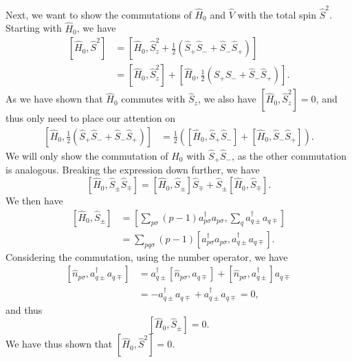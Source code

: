 Next, we want to show the commutations of $\hat{H}_0$ and $\hat{V}$ with the total spin $\hat{S}^2$.
Starting with $\hat{H}_0$, we have
\begin{align*}
    \left[ \hat{H}_0, \hat{S}^2 \right]
    &= \left[
        \hat{H}_0,
        \hat{S}_z^2 + \frac{1}{2}(\hat{S}_+ \hat{S}_- + \hat{S}_- \hat{S}_+)
    \right] \\
    &= \left[ \hat{H}_0, \hat{S}_z^2 \right] + \left[ \hat{H}_0, \frac{1}{2}(\hat{S}_+ \hat{S}_- + \hat{S}_- \hat{S}_+) \right].
\end{align*}
As we have shown that $\hat{H}_0$ commutes with $\hat{S}_z$, we also have $\left[ \hat{H}_0, \hat{S}_z^2 \right] = 0$, and thus only need to place our attention on
\begin{align*}
    \left[ \hat{H}_0, \frac{1}{2}(\hat{S}_+ \hat{S}_- + \hat{S}_- \hat{S}_+) \right]
    &= \frac{1}{2} \left(
        \left[
            \hat{H}_0, \hat{S}_+ \hat{S}_-
        \right]
        + \left[
            \hat{H}_0, \hat{S}_- \hat{S}_+
        \right]
    \right).
\end{align*}
We will only show the commutation of $\hat{H}_0$ with $\hat{S}_+ \hat{S}_-$, as the other commutation is analogous.
Breaking the expression down further, we have
\begin{equation*}
    \left[ \hat{H}_0, \hat{S}_\pm \hat{S}_\mp \right]
    = \left[ \hat{H}_0, \hat{S}_\pm \right] \hat{S}_\mp + \hat{S}_\pm \left[ \hat{H}_0, \hat{S}_\mp \right].
\end{equation*}
We then have
\begin{align*}
    \left[ \hat{H}_0, \hat{S}_{\pm} \right]
    &= \left[
        \sum_{p\sigma} (p-1) a_{p\sigma}^{\dagger} a_{p\sigma},
        \sum_{q} a^\dag_{q\pm} a_{q\mp}
    \right] \\
    &= \sum_{pq \sigma} (p-1) \left[
        a_{p\sigma}^{\dagger} a_{p\sigma},
        a^\dag_{q\pm} a_{q\mp}
    \right].
\end{align*}
Considering the commutation, using the number operator, we have
\begin{align*}
    \left[ \hat{n}_{p\sigma}, a^\dag_{q\pm} a_{q\mp} \right]
    &= a^\dag_{q\pm} \left[ \hat{n}_{p\sigma}, a_{q\mp} \right] + \left[ \hat{n}_{p\sigma}, a^\dag_{q\pm} \right] a_{q\mp} \\
    &= - a^\dag_{q\pm} a_{q\mp} + a^\dag_{q\pm} a_{q\mp} = 0,
\end{align*}
and thus
\begin{equation*}
    \left[ \hat{H}_0, \hat{S}_{\pm} \right] = 0.
\end{equation*}
We have thus shown that $\left[ \hat{H}_0, \hat{S}^2 \right] = 0$.


